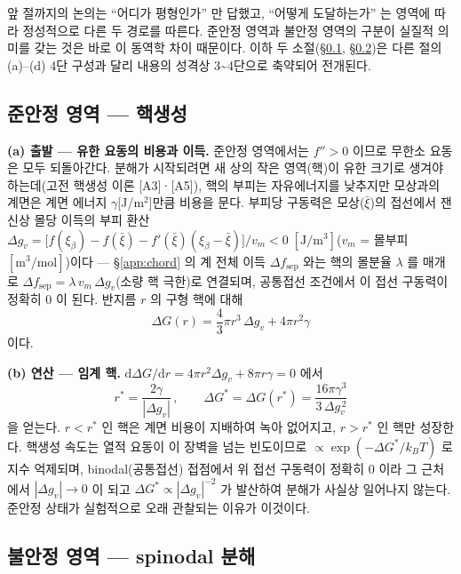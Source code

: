 \documentclass[11pt,a4paper]{article}
\newcommand{\dd}{\mathrm{d}}
\begin{document}
앞 절까지의 논의는 ``어디가 평형인가'' 만 답했고, ``어떻게 도달하는가'' 는 영역에 따라 정성적으로
다른 두 경로를 따른다. 준안정 영역과 불안정 영역의 구분이 실질적 의미를 갖는 것은 바로 이 동역학
차이 때문이다. 이하 두 소절(\S\ref{app:nucleation}, \S\ref{app:spindecomp})은 다른 절의 (a)--(d) 4단
구성과 달리 내용의 성격상 3\textasciitilde4단으로 축약되어 전개된다.

\subsection{준안정 영역 --- 핵생성}\label{app:nucleation}

\textbf{(a) 출발 --- 유한 요동의 비용과 이득.} 준안정 영역에서는 $f''>0$ 이므로 무한소 요동은 모두
되돌아간다. 분해가 시작되려면 새 상의 작은 영역(핵)이 유한 크기로 생겨야 하는데(고전 핵생성 이론 [A3]·[A5]), 핵의
부피는 자유에너지를 낮추지만 모상과의 계면은 계면 에너지 $\gamma$[J/m$^2$]만큼 비용을 문다. 부피당
구동력은 모상($\bar\xi$)의 접선에서 잰 신상 몰당 이득의 부피 환산
$\Delta g_v=\bigl[f(\xi_\beta)-f(\bar\xi)-f'(\bar\xi)(\xi_\beta-\bar\xi)\bigr]/v_m<0\;[\mathrm{J/m^3}]$($v_m$ =
몰부피 $[\mathrm{m^3/mol}]$)이다
--- \S\ref{app:chord} 의 계 전체 이득 $\Delta f_\mathrm{sep}$ 와는 핵의 몰분율 $\lambda$ 를 매개로
$\Delta f_\mathrm{sep}=\lambda\,v_m\,\Delta g_v$(소량 핵 극한)로 연결되며, 공통접선 조건에서 이 접선
구동력이 정확히 $0$ 이 된다. 반지름 $r$ 의 구형 핵에 대해
\begin{equation}
\Delta G(r)=\frac{4}{3}\pi r^3\,\Delta g_v+4\pi r^2\gamma
\label{eq:app-cnt}
\end{equation}
이다.

\textbf{(b) 연산 --- 임계 핵.} $\dd\Delta G/\dd r=4\pi r^2\Delta g_v+8\pi r\gamma=0$ 에서
\begin{equation}
r^\ast=\frac{2\gamma}{|\Delta g_v|}\,,\qquad
\Delta G^\ast=\Delta G(r^\ast)=\frac{16\pi\gamma^3}{3\,\Delta g_v^{\,2}}
\label{eq:app-rstar}
\end{equation}
을 얻는다. $r<r^\ast$ 인 핵은 계면 비용이 지배하여 녹아 없어지고, $r>r^\ast$ 인 핵만 성장한다. 핵생성
속도는 열적 요동이 이 장벽을 넘는 빈도이므로 $\propto\exp(-\Delta G^\ast/k_BT)$ 로 지수 억제되며,
binodal(공통접선) 접점에서 위 접선 구동력이 정확히 $0$ 이라 그 근처에서
$|\Delta g_v|\to0$ 이 되고 $\Delta G^\ast\propto|\Delta g_v|^{-2}$ 가 발산하여
분해가 사실상 일어나지 않는다. 준안정 상태가 실험적으로 오래 관찰되는 이유가 이것이다.

\subsection{불안정 영역 --- spinodal 분해}\label{app:spindecomp}
\end{document}
